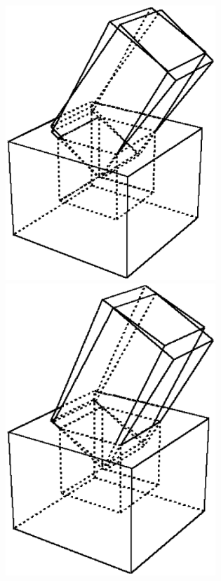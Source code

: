 \begin{figure}[h]
\begin{center}
\includegraphics[width=7.9cm]{fig/fig-peg-naname-m1.ps}
\includegraphics[width=7.9cm]{fig/fig-peg-naname-m2.ps}

\end{center}
\end{figure}
